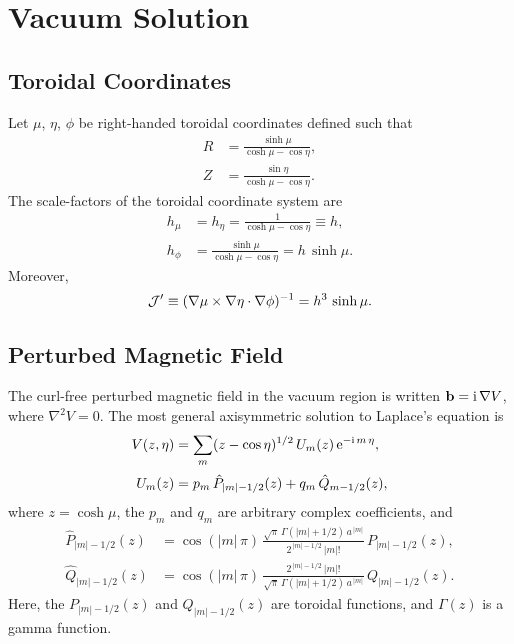 \documentclass[12pt,prb,aps,notitlepage]{revtex4-1}
\begin{document}
\section{Vacuum Solution}\label{vacuum}
\subsection{Toroidal Coordinates}
Let $\mu$, $\eta$, $\phi$ be right-handed toroidal coordinates defined such that 
\begin{align}
R &= \frac{\sinh\mu}{\cosh\mu-\cos\eta},\\[0.5ex]
Z&=\frac{\sin\eta}{\cosh\mu-\cos\eta}.
\end{align}
The scale-factors of the toroidal coordinate system are
\begin{align}
h_\mu&=h_\eta= \frac{1}{\cosh\mu-\cos\eta}\equiv h,\\[0.5ex]
h_\phi &= \frac{\sinh\mu}{\cosh\mu-\cos\eta} = h\,\sinh\mu.
\end{align}
Moreover, 
\begin{equation}
{\cal J}' \equiv (\nabla\mu\times\nabla\eta\cdot\nabla\phi)^{-1}= h^3\,\sinh\mu.
\end{equation}

\subsection{Perturbed Magnetic Field}
The curl-free perturbed magnetic field in the vacuum region is written ${\bf b} = {\rm i}\,\nabla V$,
where
$\nabla^2 V =0$.
The most general axisymmetric  solution to Laplace's equation is
\begin{align}
V(z,\eta)&= \sum_m (z-\cos\eta)^{1/2}\,U_m(z)\,{\rm e}^{-{\rm i}\,m\,\eta}, \\[0.5ex]
U_m(z) &= p_m\,\hat{P}_{|m|-1/2}(z)+q_m\,\hat{Q}_{m-1/2}(z),
\end{align}
where  $z=\cosh\mu$, the $p_m$ and $q_m$ are arbitrary complex coefficients, and 
\begin{align}\label{e21dd}
\hat{P}_{|m|-1/2}(z) &= \cos(|m|\,\pi)\,\frac{\sqrt{\pi}\,\Gamma(|m|+1/2)\,a^{\,|m|}}{2^{\,|m|-1/2}\,|m|!}\,P_{|m|-1/2}(z),\\[0.5ex]
\hat{Q}_{|m|-1/2}(z)&= \cos(|m|\,\pi)\,\frac{2^{\,|m|-1/2}\,|m|!}{\sqrt{\pi}\,\Gamma(|m|+1/2)\,a^{\,|m|}}\,Q_{|m|-1/2}(z).\label{e22dd}
\end{align}
Here,  the $P_{|m|-1/2}(z)$  and $Q_{|m|-1/2}(z)$ are toroidal functions, and $\Gamma(z)$ is a
gamma function.
\end{document}
